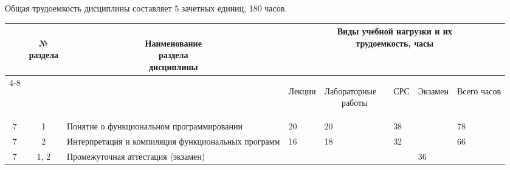 Общая трудоемкость дисциплины составляет 5 зачетных единиц, 180 часов.

\begin{center}
\begin{longtable}{|c|c|p{}|p{1.4cm}|p{1.4cm}|p{1.4cm}|p{1.4cm}|p{1.4cm}|}\hline
\multicolumn{1}{|c|}{\multirow{2}{*}{\parbox[c]{1.7cm}{}}} &
\multicolumn{1}{c|}{\multirow{2}{*}{\parbox[c]{1.6cm}{\bfseries~\\№\\раздела}}} &
\multicolumn{1}{c|}{\multirow{2}{*}{\parbox[c]{0.2\textwidth}{\bfseries~\\Наименование\\раздела\\дисциплины}}} &
\multicolumn{5}{c|}{\parbox[c]{0.4\textwidth}{\bfseries{}Виды учебной нагрузки и их\\ трудоемкость, часы}}\\\cline{4-8}
& & &
\multicolumn{1}{c|}{\bfseries\begin{sideways}Лекции\end{sideways}} &
\multicolumn{1}{c|}{\bfseries\begin{sideways}\parbox[c]{1.4cm}{Лабораторные~~\\работы}\end{sideways}} &
\multicolumn{1}{c|}{\bfseries\begin{sideways}СРС\end{sideways}} &
\multicolumn{1}{c|}{\bfseries\begin{sideways}\parbox[c]{0.25\textwidth}{Экзамен}\end{sideways}} &
\multicolumn{1}{c|}{\bfseries\begin{sideways}Всего часов\end{sideways}}\\\hline
7 & 1 & Понятие о функциональном программировании & 20 & 20 & 38 & & 78\\\hline
7 & 2 & Интерпретация и компиляция функциональных программ & 16 & 18 & 32 & & 66\\\hline
7 & 1, 2 & Промежуточная аттестация (экзамен) &  &  &  & 36 & \\\hline

\end{longtable}
\end{center}



